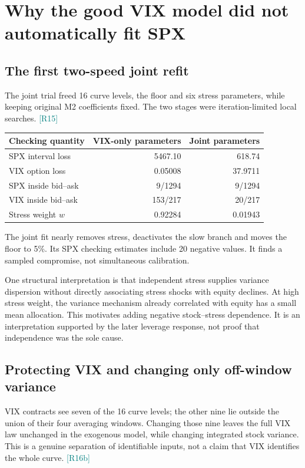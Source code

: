 \documentclass[11pt,a4paper]{article}
\newcommand{\src}[1]{\textcolor{teal}{\small[#1]}}
\begin{document}
\section{Why the good VIX model did not automatically fit SPX}
\subsection{The first two-speed joint refit}
The joint trial freed 16 curve levels, the floor and six stress parameters, while keeping original M2 coefficients fixed. The two stages were iteration-limited local searches. \src{R15}

\begin{center}\begin{tabular}{lrr}\toprule
Checking quantity & VIX-only parameters & Joint parameters\\\midrule
SPX interval loss & 5467.10 & 618.74\\
VIX option loss & 0.05008 & 37.9711\\
SPX inside bid--ask & 9/1294 & 9/1294\\
VIX inside bid--ask & 153/217 & 20/217\\
Stress weight $w$ & 0.92284 & 0.01943\\\bottomrule
\end{tabular}\end{center}
The joint fit nearly removes stress, deactivates the slow branch and moves the floor to 5\%. Its SPX checking estimates include 20 negative values. It finds a sampled compromise, not simultaneous calibration.

One structural interpretation is that independent stress supplies variance dispersion without directly associating stress shocks with equity declines. At high stress weight, the variance mechanism already correlated with equity has a small mean allocation. This motivates adding negative stock--stress dependence. It is an interpretation supported by the later leverage response, not proof that independence was the sole cause.

\subsection{Protecting VIX and changing only off-window variance}
VIX contracts see seven of the 16 curve levels; the other nine lie outside the union of their four averaging windows. Changing those nine leaves the full VIX law unchanged in the exogenous model, while changing integrated stock variance. This is a genuine separation of identifiable inputs, not a claim that VIX identifies the whole curve. \src{R16b}
\end{document}
